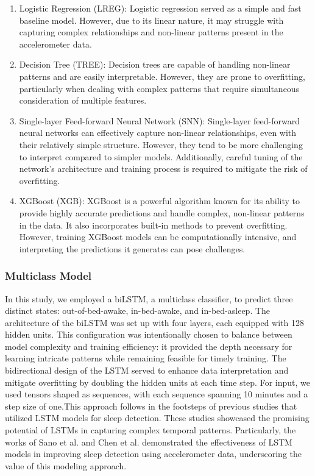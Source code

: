\documentclass[
  super,
  preprint,
  3p]{elsarticle}
\begin{document}
\begin{enumerate}
\def\labelenumi{\arabic{enumi}.}
\item
  Logistic Regression (LREG): Logistic regression served as a simple and
  fast baseline model. However, due to its linear nature, it may
  struggle with capturing complex relationships and non-linear patterns
  present in the accelerometer data.
\item
  Decision Tree (TREE): Decision trees are capable of handling
  non-linear patterns and are easily interpretable. However, they are
  prone to overfitting, particularly when dealing with complex patterns
  that require simultaneous consideration of multiple features.
\item
  Single-layer Feed-forward Neural Network (SNN): Single-layer
  feed-forward neural networks can effectively capture non-linear
  relationships, even with their relatively simple structure. However,
  they tend to be more challenging to interpret compared to simpler
  models. Additionally, careful tuning of the network's architecture and
  training process is required to mitigate the risk of overfitting.
\item
  XGBoost (XGB): XGBoost is a powerful algorithm known for its ability
  to provide highly accurate predictions and handle complex, non-linear
  patterns in the data. It also incorporates built-in methods to prevent
  overfitting. However, training XGBoost models can be computationally
  intensive, and interpreting the predictions it generates can pose
  challenges.
\end{enumerate}

\hypertarget{multiclass-model}{%
\subsubsection{Multiclass Model}\label{multiclass-model}}

In this study, we employed a biLSTM, a multiclass classifier, to predict
three distinct states: out-of-bed-awake, in-bed-awake, and
in-bed-asleep. The architecture of the biLSTM was set up with four
layers, each equipped with 128 hidden units. This configuration was
intentionally chosen to balance between model complexity and training
efficiency: it provided the depth necessary for learning intricate
patterns while remaining feasible for timely training. The bidirectional
design of the LSTM served to enhance data interpretation and mitigate
overfitting by doubling the hidden units at each time step. For input,
we used tensors shaped as sequences, with each sequence spanning 10
minutes and a step size of one.This approach follows in the footsteps of
previous studies that utilized LSTM models for sleep detection. These
studies showcased the promising potential of LSTMs in capturing complex
temporal patterns. Particularly, the works of Sano et al.
\citep{sano2019} and Chen et al. \citep{chen2021} demonstrated the
effectiveness of LSTM models in improving sleep detection using
accelerometer data, underscoring the value of this modeling approach.
\end{document}

